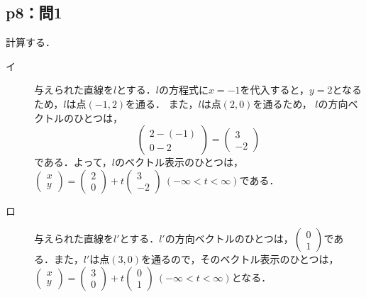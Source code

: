 \documentclass[uplatex,dvipdfmx,a4paper,10pt,fleqn]{jsarticle}
\begin{document}
\newpage

\subsection*{p8：問1}

\begin{tleftbar}
    計算する．
	\begin{description}
        \item[イ] 
    与えられた直線を$l$とする．$l$の方程式に$x=-1$を代入すると，$y=2$となるため，$l$は点$(-1,2)$を通る．
	また，$l$は点$(2,0)$を通るため，
		$l$の方向ベクトルのひとつは，
		\[
        \begin{pmatrix}
            2-(-1)\\
            0-2
        \end{pmatrix} 
        =
            \begin{pmatrix}
                3 \\
                -2
            \end{pmatrix}
            \]
		である．よって，$l$のベクトル表示のひとつは，
		$
		\begin{pmatrix}
			x \\
			y
		\end{pmatrix}
		= 
		\begin{pmatrix}
		2 \\
		0
		\end{pmatrix}
		+t 
			\begin{pmatrix}
				3 \\
				-2
			\end{pmatrix}
			~(-\infty < t < \infty)$である．
			\item[ロ]
            与えられた直線を$l'$とする．$l '$の方向ベクトルのひとつは，$
				\begin{pmatrix}
					0 \\
					1
				\end{pmatrix}
			$である．また，$l '$は点$(3,0)$を通るので，そのベクトル表示のひとつは，
			$
				\begin{pmatrix}
					x \\
					y
				\end{pmatrix}
			= 
				\begin{pmatrix}
				3 \\
				0
				\end{pmatrix}
			+t 
				\begin{pmatrix}
					0 \\
					1
                    \end{pmatrix}
                     ~(-\infty < t < \infty)
				$となる．
                \end{description}
		\end{tleftbar}
		
\end{document}
